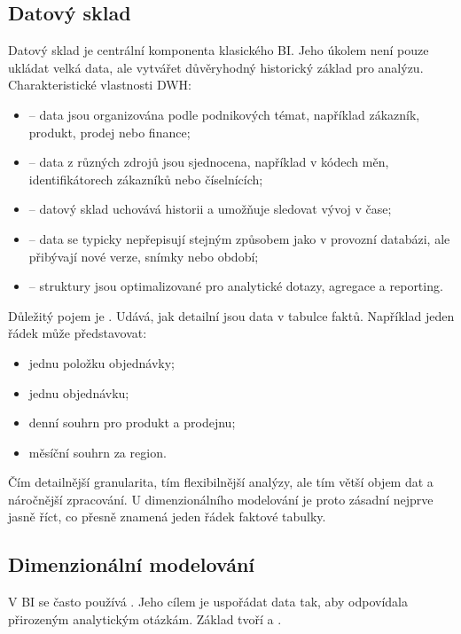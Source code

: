 \subsection{Datový sklad}
Datový sklad je centrální komponenta klasického BI. Jeho úkolem není pouze ukládat velká data, ale vytvářet důvěryhodný historický základ pro analýzu. Charakteristické vlastnosti DWH:
\begin{itemize}
  \item {} -- data jsou organizována podle podnikových témat, například zákazník, produkt, prodej nebo finance;
  \item {} -- data z různých zdrojů jsou sjednocena, například v kódech měn, identifikátorech zákazníků nebo číselnících;
  \item {} -- datový sklad uchovává historii a umožňuje sledovat vývoj v čase;
  \item {} -- data se typicky nepřepisují stejným způsobem jako v provozní databázi, ale přibývají nové verze, snímky nebo období;
  \item {} -- struktury jsou optimalizované pro analytické dotazy, agregace a reporting.
\end{itemize}

Důležitý pojem je . Udává, jak detailní jsou data v tabulce faktů. Například jeden řádek může představovat:
\begin{itemize}
  \item jednu položku objednávky;
  \item jednu objednávku;
  \item denní souhrn pro produkt a prodejnu;
  \item měsíční souhrn za region.
\end{itemize}

Čím detailnější granularita, tím flexibilnější analýzy, ale tím větší objem dat a náročnější zpracování. U dimenzionálního modelování je proto zásadní nejprve jasně říct, co přesně znamená jeden řádek faktové tabulky.

\subsection{Dimenzionální modelování}
V BI se často používá . Jeho cílem je uspořádat data tak, aby odpovídala přirozeným analytickým otázkám. Základ tvoří  a .


